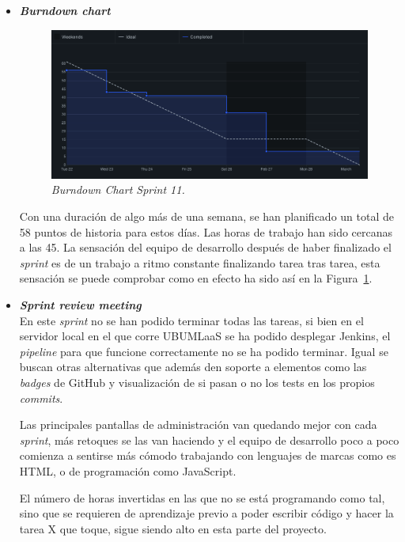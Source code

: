\begin{itemize}
\item \textbf{\textit{Burndown chart}}\\
\begin{figure}
\begin{center}
\includegraphics[width=\textwidth]{../img/anexos/sprints/BD-Sprint11}
\caption{\textit{Burndown Chart Sprint 11.}}\label{fig:BD-Sprint11}
\end{center}
\end{figure}
Con una duración de algo más de una semana, se han planificado un total de 58 puntos de historia para estos días. Las horas de trabajo han sido cercanas a las 45. La sensación del equipo de desarrollo después de haber finalizado el \textit{sprint} es de un trabajo a ritmo constante finalizando tarea tras tarea, esta sensación se puede comprobar como en efecto ha sido así en la Figura~\ref{fig:BD-Sprint11}.

\item \textbf{\textit{Sprint review meeting}}\\
En este \textit{sprint} no se han podido terminar todas las tareas, si bien en el servidor local en el que corre UBUMLaaS se ha podido desplegar Jenkins, el \textit{pipeline} para que funcione correctamente no se ha podido terminar. Igual se buscan otras alternativas que además den soporte a elementos como las \textit{badges} de GitHub y visualización de si pasan o no los tests en los propios \textit{commits}.

Las principales pantallas de administración van quedando mejor con cada \textit{sprint}, más retoques se las van haciendo y el equipo de desarrollo poco a poco comienza a sentirse más cómodo trabajando con lenguajes de marcas como es HTML, o de programación como JavaScript.

El número de horas invertidas en las que no se está programando como tal, sino que se requieren de aprendizaje previo a poder escribir código y hacer la tarea X que toque, sigue siendo alto en esta parte del proyecto.

\end{itemize}

